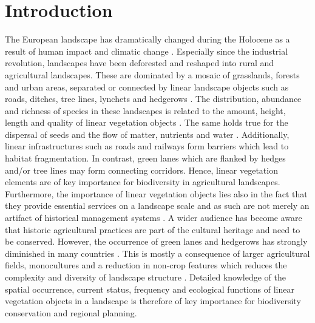 \section{Introduction}
The European landscape has dramatically changed during the Holocene as a result of human impact and climatic change \citep{turner1989landscape, marquer2017quantifying}. Especially since the industrial revolution, landscapes have been deforested and reshaped into rural and agricultural landscapes. These are dominated by a mosaic of grasslands, forests and urban areas, separated or connected by linear landscape objects such as roads, ditches, tree lines, lynchets and hedgerows \citep{bailly2008agrarian, meyer2012multifunctional, van2013modelling}. The distribution, abundance and richness of species in these landscapes is related to the amount, height, length and quality of linear vegetation objects \citep{aguirre2016functional, spellerberg1999introduction, croxton2005linear}. The same holds true for the dispersal of seeds and the flow of matter, nutrients and water \citep{turner1989landscape, burel1996hedgerows}. Additionally, linear infrastructures such as roads and railways form barriers which lead to habitat fragmentation. In contrast, green lanes which are flanked by hedges and/or tree lines may form connecting corridors. Hence, linear vegetation elements are of key importance for biodiversity in agricultural landscapes. Furthermore, the importance of linear vegetation objects lies also in the fact that they provide essential services on a landscape scale and as such are not merely an artifact of historical management systems \citep{scholefield2016model}. A wider audience has become aware that historic agricultural practices are part of the cultural heritage \citep{jongman2004landscape, gobster2007shared} and need to be conserved. However, the occurrence of  green lanes and hedgerows has strongly diminished in many countries \citep{boutin2001hedgerows, stoate2001ecological}. This is mostly a consequence of larger agricultural fields, monocultures and a reduction in non-crop features which reduces the complexity and diversity of landscape structure \citep{croxton2005linear}. Detailed knowledge of the spatial occurrence, current status, frequency and ecological functions of linear vegetation objects in a landscape is therefore of key importance for biodiversity conservation and regional planning.

